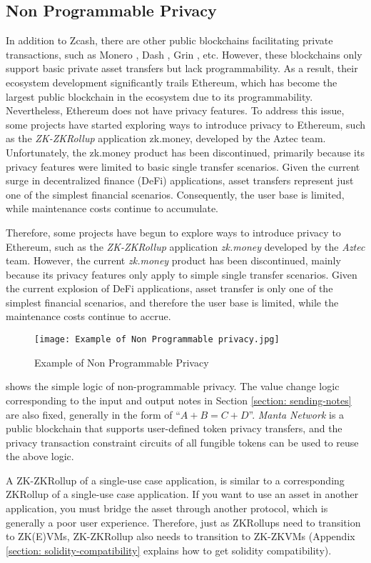 \subsection{Non Programmable Privacy}

In addition to Zcash, there are other public blockchains facilitating private transactions, such as Monero \cite{website:Monero}, Dash \cite{website:Dash}, Grin \cite{website:Grin}, etc. However, these blockchains only support basic private asset transfers but lack programmability. As a result, their ecosystem development significantly trails Ethereum, which has become the largest public blockchain in the ecosystem due to its programmability. Nevertheless, Ethereum does not have privacy features.
To address this issue, some projects have started exploring ways to introduce privacy to Ethereum, such as the \textit{ZK-ZKRollup} application zk.money, developed by the Aztec team. Unfortunately, the zk.money product has been discontinued, primarily because its privacy features were limited to basic single transfer scenarios. Given the current surge in decentralized finance (DeFi) applications, asset transfers represent just one of the simplest financial scenarios. Consequently, the user base is limited, while maintenance costs continue to accumulate.

Therefore, some projects have begun to explore ways to introduce privacy to Ethereum, such as the \textit{ZK-ZKRollup} application \textit{zk.money} \cite{website:zk.money} developed by the \textit{Aztec} \cite{website:Aztec} team. However, the current \textit{zk.money} product has been discontinued, mainly because its privacy features only apply to simple single transfer scenarios. Given the current explosion of DeFi applications, asset transfer is only one of the simplest financial scenarios, and therefore the user base is limited, while the maintenance costs continue to accrue.
\begin{figure}[!ht]
    \centering
    \texttt{[image: Example of Non Programmable privacy.jpg]}
    \caption{Example of Non Programmable Privacy}
    \label{fig:Example of Non Programmable Privacy}
\end{figure}

 shows the simple logic of non-programmable privacy. The value change logic corresponding to the input and output notes in Section \ref{section: sending-notes} are also fixed, generally in the form of ``$A + B = C + D$''. \textit{Manta Network} \cite{website:Manta-network} is a public blockchain that supports user-defined token privacy transfers, and the privacy transaction constraint circuits of all fungible tokens can be used to reuse the above logic.

A ZK-ZKRollup of a single-use case application, is similar to a corresponding ZKRollup of a single-use case application. If you want to use an asset in another application, you must bridge the asset through another protocol, which is generally a poor user experience. Therefore, just as ZKRollups need to transition to ZK(E)VMs, ZK-ZKRollup also needs to transition to ZK-ZKVMs (Appendix \ref{section: solidity-compatibility} explains how to get solidity compatibility).
